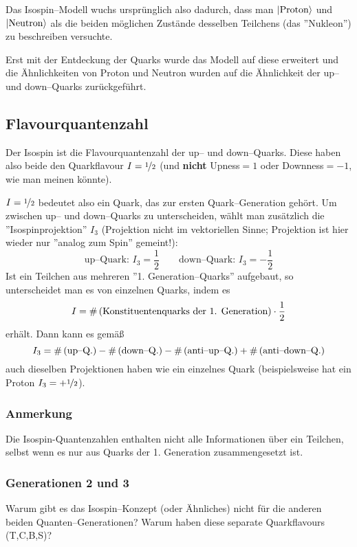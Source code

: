 \documentclass[Ex4_Zusammenfassung.tex]{subfiles}
\begin{document}
Das Isospin--Modell wuchs ursprünglich also dadurch, dass man $\ket{\text{Proton}}$ und $\ket{\text{Neutron}}$ als die beiden möglichen Zustände desselben Teilchens (das ''Nukleon'') zu beschreiben versuchte.

Erst mit der Entdeckung der Quarks wurde das Modell auf diese erweitert und die Ähnlichkeiten von Proton und Neutron wurden auf die Ähnlichkeit der up-- und down--Quarks zurückgeführt.
\subsection{Flavourquantenzahl}
Der Isospin ist die Flavourquantenzahl der up-- und down--Quarks. Diese haben also beide den Quarkflavour $I=\nicefrac{1}{2}$ (und \textbf{nicht} Upness$=1$ oder Downness$=-1$, wie man meinen könnte).

$I = \nicefrac{1}{2}$ bedeutet also ein Quark, das zur ersten Quark--Generation gehört. Um zwischen up-- und down--Quarks zu unterscheiden, wählt man zusätzlich die ''Isospinprojektion'' $I_3$ (Projektion nicht im vektoriellen Sinne; Projektion ist hier wieder nur ''analog zum Spin'' gemeint!):
\begin{equation*}
	\text{up--Quark: } I_3=\frac{1}{2}\qquad \text{down--Quark: } I_3=-\frac{1}{2}
\end{equation*}
Ist ein Teilchen aus mehreren ''1. Generation--Quarks'' aufgebaut, so unterscheidet man es von einzelnen Quarks, indem es
\begin{equation}
	I = \#\left( \text{Konstituentenquarks der 1. Generation} \right) \cdot \frac{1}{2}
\end{equation}
erhält. Dann kann es gemäß
\begin{equation}
	I_3 = \#\left( \text{up--Q.} \right) - \# \left( \text{down--Q.} \right) - \# \left( \text{anti--up--Q.} \right) + \# \left( \text{anti--down--Q.} \right)
\end{equation}
auch dieselben Projektionen haben wie ein einzelnes Quark (beispielsweise hat ein Proton $I_3=+\nicefrac{1}{2}$).
\subsubsection*{Anmerkung}
Die Isospin-Quantenzahlen enthalten nicht alle Informationen über ein Teilchen, selbst wenn es nur aus Quarks der 1. Generation zusammengesetzt ist.

\subsubsection*{Generationen 2 und 3}
Warum gibt es das Isospin--Konzept (oder Ähnliches) nicht für die anderen beiden Quanten--Generationen? Warum haben diese separate Quarkflavours (T,C,B,S)?
\end{document}
